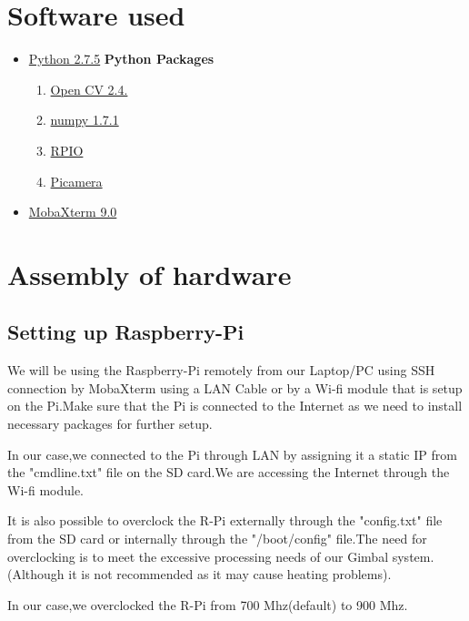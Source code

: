 \documentclass[a4paper,12pt,oneside]{book}
\begin{document}
\section{Software used}
\begin{itemize}
  \item \href{https://www.python.org/downloads}{Python 2.7.5}
  \newline \textbf{Python Packages}
  \begin{enumerate}
       \item \href{http://opencv.org/downloads.html}{Open CV 2.4.}
       \item \href{http://opencv.org/downloads.html}{numpy 1.7.1}
       \item \href{https://pypi.python.org/pypi/RPIO}{RPIO}
       \item \href{https://pypi.python.org/pypi/picamera/1.1}{Picamera}
  \end{enumerate}
  \item \href{http://mobaxterm.mobatek.net/download.html}{MobaXterm 9.0}
\end{itemize}

\section{Assembly of hardware}
\subsection{Setting up Raspberry-Pi}
		\par We will be using the Raspberry-Pi remotely from our Laptop/PC using SSH connection by MobaXterm using a LAN Cable or by a Wi-fi module that is setup on the Pi.Make sure that the Pi is connected to the Internet as we need to install necessary packages for further setup.
		\par In our case,we connected to the Pi through LAN by assigning it a static IP from the "cmdline.txt" file on the SD card.We are accessing the Internet through the Wi-fi module.
		\par It is also possible to overclock the R-Pi externally through the "config.txt" file from the SD card or internally through the "/boot/config" file.The need for overclocking is to meet the excessive processing needs of our Gimbal system.(Although it is not recommended as it may cause heating problems).
		\par In our case,we overclocked the R-Pi from 700 Mhz(default) to 900 Mhz.
		
\end{document}
